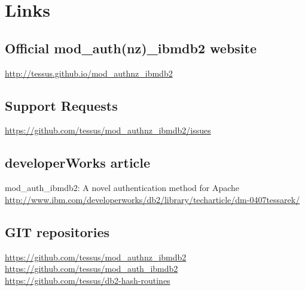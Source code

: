 \section{Links}
\subsection{Official mod\_auth(nz)\_ibmdb2 website}
\url{http://tessus.github.io/mod_authnz_ibmdb2}
\subsection{Support Requests}
\url{https://github.com/tessus/mod_authnz_ibmdb2/issues}
\subsection{developerWorks article}
mod\_auth\_ibmdb2: A novel authentication method for Apache\\
\url{http://www.ibm.com/developerworks/db2/library/techarticle/dm-0407tessarek/}
\subsection{GIT repositories}
\url{https://github.com/tessus/mod_authnz_ibmdb2}\\
\url{https://github.com/tessus/mod_auth_ibmdb2}\\
\url{https://github.com/tessus/db2-hash-routines}\\
